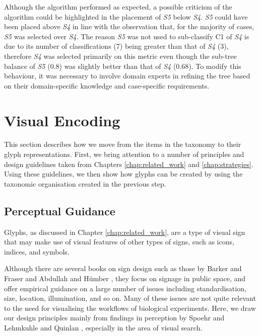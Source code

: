 Although the algorithm performed as expected, a possible criticism of the algorithm could be highlighted in the placement of \emph{S5} below \emph{S4}.
\emph{S5} could have been placed above \emph{S4} in line with the observation that, for the majority of cases, \emph{S5} was selected over \emph{S4}.
The reason \emph{S5} was not used to sub-classify C1 of \emph{S4} is due to its number of classifications (7) being greater than that of \emph{S4} (3), therefore \emph{S4} was selected primarily on this metric even though the sub-tree balance of \emph{S5} (0.8) was slightly better than that of \emph{S4} (0.68).
To modify this behaviour, it was necessary to involve domain experts in refining the tree based on their domain-specific knowledge and case-specific requirements.


%

\section{Visual Encoding}
\label{sec:Glyphs}

This section describes how we move from the items in the taxonomy to their glyph representations. First, we bring attention to a number of principles and design guidelines taken from Chapters \ref{chap:related_work} and \ref{chap:strategies}.
Using these guidelines, we then show how glyphs can be created by using the taxonomic organisation created in the previous step.

\subsection{Perceptual Guidance}
%
Glyphs, as discussed in Chapter \ref{chap:related_work}, are a type of visual sign that may make use of visual features of other types of signs, such as icons, indices, and symbols.

Although there are several books on sign design such as those by Barker and Fraser \cite{barker00} and Abdullah and H\"{u}mber \cite{abdullah06}, they focus on signage in public space, and offer empirical guidance on a large number of issues including standardisation, size, location, illumination, and so on.
Many of these issues are not quite relevant to the need for visualising the workflows of biological experiments.
Here, we draw our design principles mainly from findings in perception by Spoehr and Lehmkuhle \cite{spoehr82} and Quinlan \cite{quinlan03}, especially in the area of visual search.

